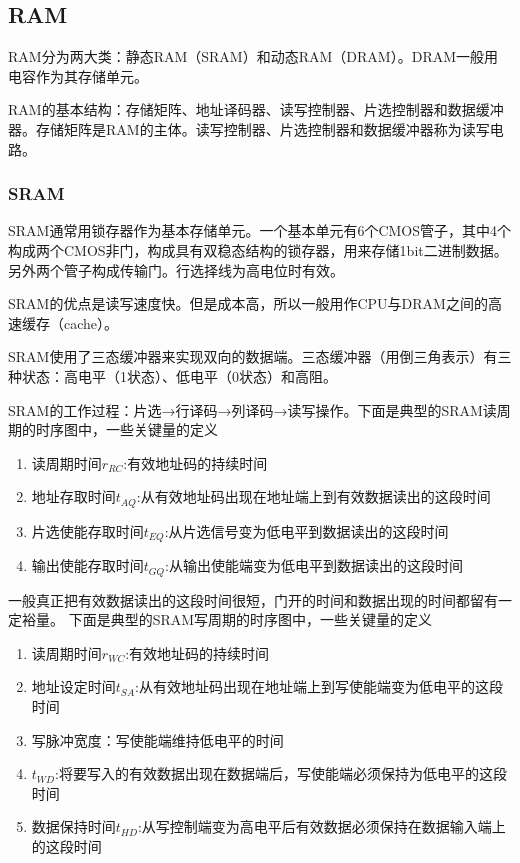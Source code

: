 \documentclass{ctexart}
\begin{document}
\subsection{RAM}
RAM分为两大类：静态RAM（SRAM）和动态RAM（DRAM）。DRAM一般用电容作为其存储单元。

RAM的基本结构：存储矩阵、地址译码器、读写控制器、片选控制器和数据缓冲器。存储矩阵是RAM的主体。读写控制器、片选控制器和数据缓冲器称为读写电路。
\subsubsection{SRAM}
SRAM通常用锁存器作为基本存储单元。一个基本单元有6个CMOS管子，其中4个构成两个CMOS非门，构成具有双稳态结构的锁存器，用来存储1bit二进制数据。另外两个管子构成传输门。行选择线为高电位时有效。

SRAM的优点是读写速度快。但是成本高，所以一般用作CPU与DRAM之间的高速缓存（cache）。

SRAM使用了三态缓冲器来实现双向的数据端。三态缓冲器（用倒三角表示）有三种状态：高电平（1状态）、低电平（0状态）和高阻。

SRAM的工作过程：片选→行译码→列译码→读写操作。下面是典型的SRAM读周期的时序图中，一些关键量的定义
\begin{enumerate}
    \item 读周期时间$r_{RC}$:有效地址码的持续时间
    \item 地址存取时间$t_{AQ}$:从有效地址码出现在地址端上到有效数据读出的这段时间
    \item 片选使能存取时间$t_{EQ}$:从片选信号变为低电平到数据读出的这段时间
    \item 输出使能存取时间$t_{GQ}$:从输出使能端变为低电平到数据读出的这段时间
\end{enumerate}
一般真正把有效数据读出的这段时间很短，门开的时间和数据出现的时间都留有一定裕量。
下面是典型的SRAM写周期的时序图中，一些关键量的定义
\begin{enumerate}
    \item 读周期时间$r_{WC}$:有效地址码的持续时间
    \item 地址设定时间$t_{SA}$:从有效地址码出现在地址端上到写使能端变为低电平的这段时间
    \item 写脉冲宽度：写使能端维持低电平的时间
    \item $t_{WD}$:将要写入的有效数据出现在数据端后，写使能端必须保持为低电平的这段时间
    \item 数据保持时间$t_{HD}$:从写控制端变为高电平后有效数据必须保持在数据输入端上的这段时间
\end{enumerate}
\end{document}
